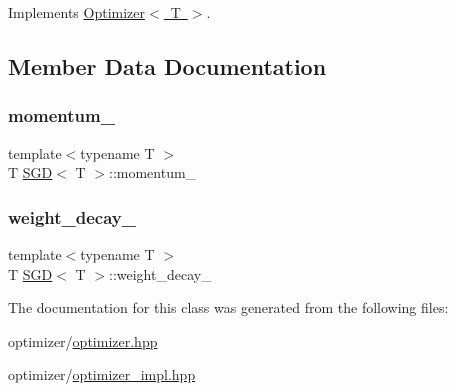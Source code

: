 Implements \mbox{\hyperlink{class_optimizer_a3f4859896cf9edab31b3875af7aad0cd}{Optimizer$<$ T $>$}}.



\subsection{Member Data Documentation}
\mbox{\label{class_s_g_d_abc4dc58d224e921bc278508f5edfe1bd}} 
\subsubsection{\texorpdfstring{momentum\_}{momentum\_}}
{\footnotesize\ttfamily template$<$typename T $>$ \\
T \mbox{\hyperlink{class_s_g_d}{S\+GD}}$<$ T $>$\+::momentum\+\_\+\hspace{0.3cm}{\ttfamily [protected]}}

\mbox{\label{class_s_g_d_ae34e45e15ff22ca62ee0d61104da2ff7}} 
\subsubsection{\texorpdfstring{weight\_decay\_}{weight\_decay\_}}
{\footnotesize\ttfamily template$<$typename T $>$ \\
T \mbox{\hyperlink{class_s_g_d}{S\+GD}}$<$ T $>$\+::weight\+\_\+decay\+\_\+\hspace{0.3cm}{\ttfamily [protected]}}



The documentation for this class was generated from the following files\+:\begin{DoxyCompactItemize}
\item 
optimizer/\mbox{\hyperlink{optimizer_8hpp}{optimizer.\+hpp}}\item 
optimizer/\mbox{\hyperlink{optimizer__impl_8hpp}{optimizer\+\_\+impl.\+hpp}}\end{DoxyCompactItemize}
